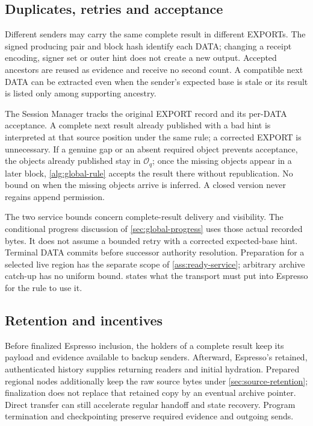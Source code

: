 \documentclass[11pt,a4paper]{article}
\begin{document}
\subsection{Duplicates, retries and acceptance}
Different senders may carry the same complete result in different EXPORTs.
The signed producing pair and block hash identify each DATA; changing a
receipt encoding, signer set or outer hint does not create a new output.
Accepted ancestors are reused as evidence and receive no second count.
A compatible next DATA can be extracted even when the sender's expected
base is stale or its result is listed only among supporting ancestry.

The Session Manager tracks the original EXPORT record and its per-DATA
acceptance. A complete next result already published with a bad hint is
interpreted at that source position under the same rule; a corrected
EXPORT is unnecessary.
If a genuine gap or an absent required object prevents acceptance, the
objects already published stay in $\mathcal O_q$; once the missing
objects appear in a later block, \cref{alg:global-rule} accepts the
result there without republication. No bound on when the missing
objects arrive is inferred. A closed version never regains append
permission.

The two service bounds concern complete-result delivery and visibility.
The conditional progress discussion of \cref{sec:global-progress}
uses those actual recorded bytes. It does not assume a bounded retry
with a corrected expected-base hint. Terminal DATA commits before successor authority
resolution. Preparation for a selected live region has the separate
scope of \cref{ass:ready-service}; arbitrary archive catch-up has no
uniform bound.  states what the transport
must put into Espresso for the rule to use it.

\subsection{Retention and incentives}
Before finalized Espresso inclusion, the holders of a complete result
keep its payload and evidence available to backup senders. Afterward,
Espresso's retained, authenticated history supplies returning readers and
initial hydration. Prepared regional nodes additionally keep the raw
source bytes under \cref{sec:source-retention}; finalization does not
replace that retained copy by an eventual archive pointer. Direct transfer
can still accelerate regular handoff and state recovery. Program
termination and checkpointing preserve required evidence and outgoing
sends.
\end{document}
